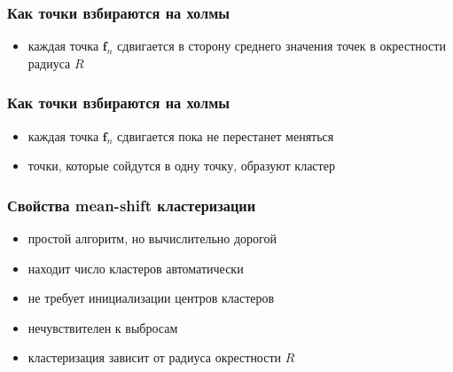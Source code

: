 \documentclass[12pt, usepdftitle=false, aspectratio=1610]{beamer}
\begin{document}
\begin{frame}
\frametitle{Как точки взбираются на холмы}
\begin{figure}
    \centering
    \quad
    \quad
\end{figure}
\begin{itemize}
    \item каждая точка $\boldsymbol{f}_n$ сдвигается в сторону среднего значения точек в окрестности радиуса $R$
\end{itemize}
\end{frame}

\begin{frame}
\frametitle{Как точки взбираются на холмы}
\begin{figure}
    \centering
    \quad
    \quad
\end{figure}
\begin{itemize}
    \item каждая точка $\boldsymbol{f}_n$ сдвигается пока не перестанет меняться
    \item точки, которые сойдутся в одну точку, образуют кластер
\end{itemize}
\end{frame}

\begin{frame}
\frametitle{Свойства mean-shift кластеризации}
\begin{itemize}
    \item простой алгоритм, но вычислительно дорогой 
    \vspace*{0.2cm}
    \item находит число кластеров автоматически
    \vspace*{0.2cm}
    \item  не требует инициализации центров кластеров
    \vspace*{0.2cm}
    \item нечувствителен к выбросам
    \vspace*{0.2cm}
    \item кластеризация зависит от радиуса окрестности $R$
\end{itemize}
\end{frame}
\end{document}
